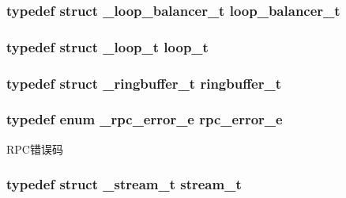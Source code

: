 \subsubsection[{loop\+\_\+balancer\+\_\+t}]{\setlength{\rightskip}{0pt plus 5cm}typedef struct {\bf \+\_\+loop\+\_\+balancer\+\_\+t} {\bf loop\+\_\+balancer\+\_\+t}}\label{a00047_a649c7e850ab247b5f70ad27e335a129d_a649c7e850ab247b5f70ad27e335a129d}
\hypertarget{a00047_a9c3ad1cd2de83e09f3a7b59fa82c94ee_a9c3ad1cd2de83e09f3a7b59fa82c94ee}{}
\subsubsection[{loop\+\_\+t}]{\setlength{\rightskip}{0pt plus 5cm}typedef struct {\bf \+\_\+loop\+\_\+t} {\bf loop\+\_\+t}}\label{a00047_a9c3ad1cd2de83e09f3a7b59fa82c94ee_a9c3ad1cd2de83e09f3a7b59fa82c94ee}
\hypertarget{a00047_af929c5cf86b6a0f64dde407dfe60482e_af929c5cf86b6a0f64dde407dfe60482e}{}
\subsubsection[{ringbuffer\+\_\+t}]{\setlength{\rightskip}{0pt plus 5cm}typedef struct {\bf \+\_\+ringbuffer\+\_\+t} {\bf ringbuffer\+\_\+t}}\label{a00047_af929c5cf86b6a0f64dde407dfe60482e_af929c5cf86b6a0f64dde407dfe60482e}
\hypertarget{a00047_aba1e847dfcabe31256c7f60abe0272a6_aba1e847dfcabe31256c7f60abe0272a6}{}
\subsubsection[{rpc\+\_\+error\+\_\+e}]{\setlength{\rightskip}{0pt plus 5cm}typedef enum {\bf \+\_\+rpc\+\_\+error\+\_\+e}  {\bf rpc\+\_\+error\+\_\+e}}\label{a00047_aba1e847dfcabe31256c7f60abe0272a6_aba1e847dfcabe31256c7f60abe0272a6}
R\+P\+C错误码 \hypertarget{a00047_a261dba04f46f5c59a68a05f69f5a65a8_a261dba04f46f5c59a68a05f69f5a65a8}{}
\subsubsection[{stream\+\_\+t}]{\setlength{\rightskip}{0pt plus 5cm}typedef struct {\bf \+\_\+stream\+\_\+t} {\bf stream\+\_\+t}}\label{a00047_a261dba04f46f5c59a68a05f69f5a65a8_a261dba04f46f5c59a68a05f69f5a65a8}
\hypertarget{a00047_a46bcd8005e5d86fdbc6be5af0a77156c_a46bcd8005e5d86fdbc6be5af0a77156c}{}
